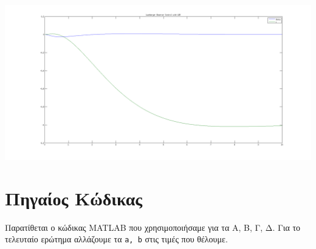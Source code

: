 \documentclass[a4paper,oneside, 12pt]{article}
\begin{document}
\includegraphics[width=\textwidth]{E6.png}

\section*{Πηγαίος Κώδικας}

Παρατίθεται ο κώδικας MATLAB που χρησιμοποιήσαμε για τα Α, Β, Γ, Δ. Για το τελευταίο ερώτημα αλλάζουμε τα \texttt{a, b} στις τιμές που θέλουμε.  
\end{document}
